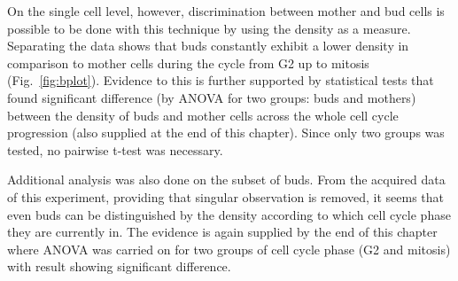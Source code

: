 On the single cell level, however, discrimination between mother and bud cells is possible to be done with this technique by using the density as a measure. 
Separating the data shows that buds constantly exhibit a lower density in comparison to mother cells during the cycle from G2 up to mitosis (Fig.~\ref{fig:bplot}). 
Evidence to this is further supported by statistical tests that found significant difference (by ANOVA for two groups: buds and mothers) between the density of buds and mother cells across the whole cell cycle progression (also supplied at the end of this chapter). 
Since only two groups was tested, no pairwise t-test was necessary.

Additional analysis was also done on the subset of buds. 
From the acquired data of this experiment, providing that singular observation is removed, it seems that even buds can be distinguished by the density according to which cell cycle phase they are currently in. 
The evidence is again supplied by the end of this chapter where ANOVA was carried on for two groups of cell cycle phase (G2 and mitosis) with result showing significant difference.




\renewcommand{\refname}{\spacedlowsmallcaps{References}} %
%


